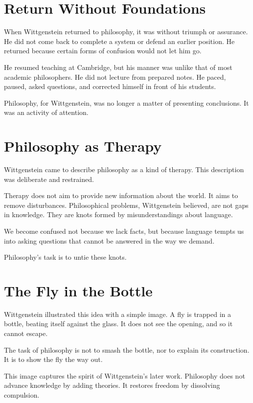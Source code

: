 \documentclass[11pt]{article}
\begin{document}
\section*{Return Without Foundations}

When Wittgenstein returned to philosophy, it was without triumph or assurance. He did not come back to complete a system or defend an earlier position. He returned because certain forms of confusion would not let him go.

He resumed teaching at Cambridge, but his manner was unlike that of most academic philosophers. He did not lecture from prepared notes. He paced, paused, asked questions, and corrected himself in front of his students.

Philosophy, for Wittgenstein, was no longer a matter of presenting conclusions. It was an activity of attention.

\section*{Philosophy as Therapy}

Wittgenstein came to describe philosophy as a kind of therapy. This description was deliberate and restrained.

Therapy does not aim to provide new information about the world. It aims to remove disturbances. Philosophical problems, Wittgenstein believed, are not gaps in knowledge. They are knots formed by misunderstandings about language.

We become confused not because we lack facts, but because language tempts us into asking questions that cannot be answered in the way we demand.

Philosophy’s task is to untie these knots.

\section*{The Fly in the Bottle}

Wittgenstein illustrated this idea with a simple image. A fly is trapped in a bottle, beating itself against the glass. It does not see the opening, and so it cannot escape.

The task of philosophy is not to smash the bottle, nor to explain its construction. It is to show the fly the way out.

This image captures the spirit of Wittgenstein’s later work. Philosophy does not advance knowledge by adding theories. It restores freedom by dissolving compulsion.
\end{document}
